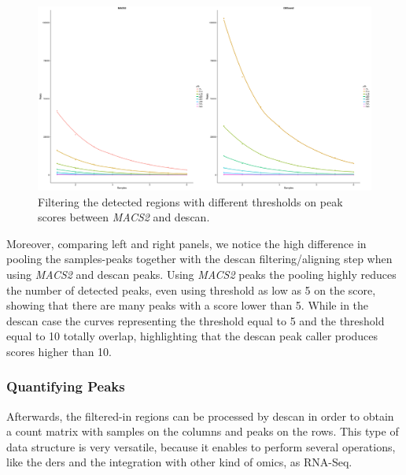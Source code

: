 \begin{figure}[H]
\includegraphics[width=\textwidth, keepaspectratio]{img/descan2/filtering_m2_d2.png}
\caption[\gls{descan} and \textit{MACS2} filtering comparison]{Filtering the detected regions with different thresholds on peak scores between \textit{MACS2} and \gls{descan}.}
\label{fig:filteringdescanmacs2}
\centering
\end{figure}


Moreover, comparing left and right panels, we notice the high difference in pooling the samples-peaks together with the \gls{descan} filtering/aligning step when using \textit{MACS2} and \gls{descan} peaks.
Using \textit{MACS2} peaks the pooling highly reduces the number of detected peaks, even using threshold as low as 5 on the score, showing that there are many peaks with a score lower than 5.
While in the \gls{descan} case the curves representing the threshold equal to 5 and the threshold equal to 10 totally overlap, highlighting that the \gls{descan} peak caller produces scores higher than 10.


\subsubsection{Quantifying Peaks}

Afterwards, the filtered-in regions can be processed by \gls{descan} in order to obtain a count matrix with samples on the columns and peaks on the rows.
This type of data structure is very versatile, because it enables to perform several operations, like the \glspl{der} and the integration with other kind of omics, as RNA-Seq.

